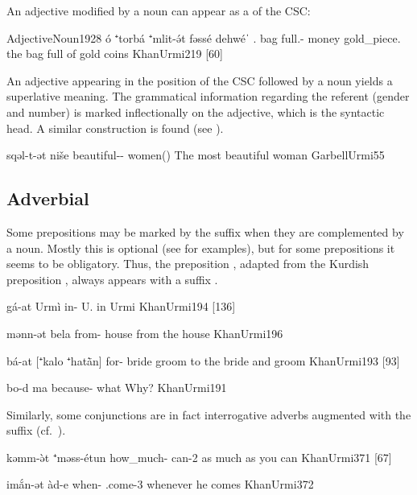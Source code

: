 An adjective modified by a noun can appear as a \prim of the CSC:

\acex
{Adjective}{Noun}{1928}
{ó ⁺torbá ⁺mlit-ə́t fəssé dehwéˈ}
{\dem.\far{} bag full.\fem-\cst{} money gold\_piece.\pl{}}
{the bag full of gold coins}
{KhanUrmi}{219 {[60]}}


An adjective appearing in the \prim position of the CSC followed by a \pl* noun yields a superlative meaning. The grammatical information regarding the referent (gender and number) is marked inflectionally on the adjective, which is the syntactic head. A similar construction is found \JZax (see ).


{sqəl-t-ət niše}
{beautiful-\fem-\cst{} women(\pl)}
{The most beautiful woman}
{GarbellUrmi}{55}



\subsection{Adverbial \prims}

Some prepositions may be marked by the \cst* suffix when they are complemented  by a noun. Mostly this is optional (see   for examples), 
 but for some prepositions it seems to be obligatory. Thus, the preposition , adapted from the Kurdish preposition , always appears with a \cst* suffix  \citep[166]{Garbell1965impact}.

{gá-at Urmì}
{in-\cst{} U.}
{in Urmi}
{KhanUrmi}{194 {[136]}}


{mənn-ət bela}
{from-\cst{} house}
{from the house}
{KhanUrmi}{196}

{bá-at [⁺kalo ⁺hatā̀n]}
{for-\cst{} bride groom}
{to the bride and groom}
{KhanUrmi}{193 {[93]}}


{bo-d\cb{} ma}
{because-\cst\cb{} what}
{Why?}
{KhanUrmi}{191}

Similarly, some conjunctions are in fact interrogative adverbs augmented with the \cst* suffix (cf.\ ).

{kəmm-ə̀t ⁺məss-étun}
{how\_much-\cst{} can-2\pl}
{as much as you can}
{KhanUrmi}{371 {[67]}}

{imắn-ət àd-e}
{when-\cst{} \sbjv\footnotemark.come-3\masc}
{whenever he comes}
{KhanUrmi}{372}

